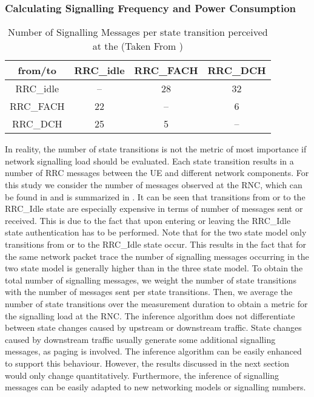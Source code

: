 \subsubsection*{Calculating Signalling Frequency and Power Consumption}\label{sec:network:network_traces:calculating_metrics}

\begin{table}\centering
\centering
\begin{tabular}{c|ccc}
    from/to & \gls{RRC_idle} & \gls{RRC_FACH} & \gls{RRC_DCH}\\
    \hline
    \gls{RRC_idle} & -- & 28 & 32\\
    \gls{RRC_FACH} & 22 & -- & 6\\
    \gls{RRC_DCH} & 25 & 5 & --    
	\end{tabular}
  \caption{Number of Signalling Messages per  state transition perceived at the  (Taken From \cite{3GPP_RRC_Spec})}
  \label{tab:network:network_traces:calculating_metrics:signalling_messages}
\end{table}

In reality, the number of state transitions is not the metric of most importance if network signalling load should be evaluated.
Each state transition results in a number of \gls{RRC} messages between the \gls{UE} and different network components.
For this study we consider the number of messages observed at the \gls{RNC}, which can be found in \cite{3GPP_RRC_Spec} and is summarized in .
It can be seen that transitions from or to the \gls{RRC_Idle} state are especially expensive in terms of number of messages sent or received.
This is due to the fact that upon entering or leaving the \gls{RRC_Idle} state authentication has to be performed. 
Note that for the two state model only transitions from or to the \gls{RRC_Idle} state occur.
This results in the fact that for the same network packet trace the number of signalling messages occurring in the two state model is generally higher than in the three state model.
To obtain the total number of signalling messages, we weight the number of state transitions with the number of messages sent per state transitions.
Then, we average the number of state transitions over the measurement duration to obtain a metric for the signalling load at the \gls{RNC}.
The inference algorithm does not differentiate between state changes caused by upstream or downstream traffic.
State changes caused by downstream traffic usually generate some additional signalling messages, as paging is involved.
The inference algorithm can be easily enhanced to support this behaviour.
However, the results discussed in the next section would only change quantitatively.
Furthermore, the inference of signalling messages can be easily adapted to new networking models or signalling numbers.

